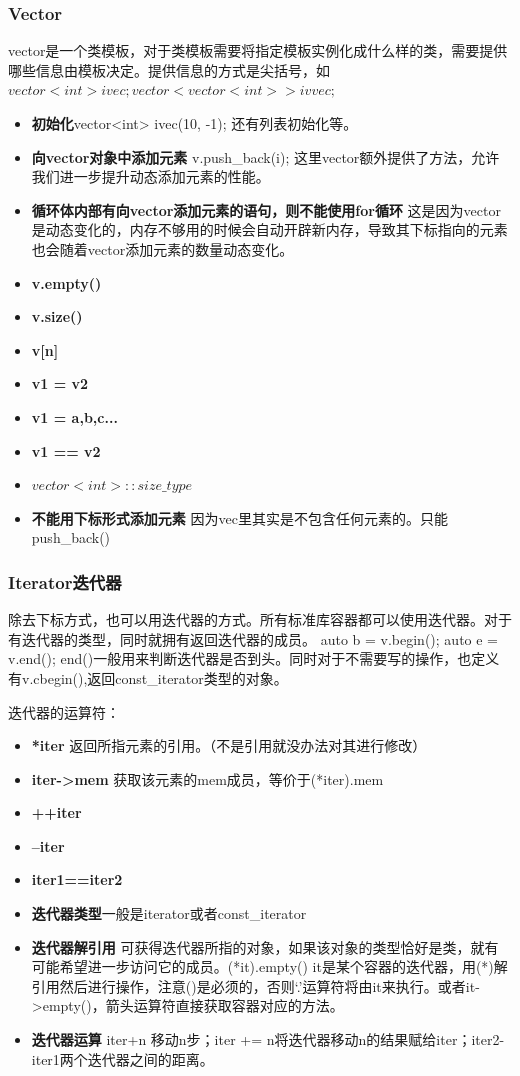 \subsubsection{Vector}
vector是一个类模板，对于类模板需要将指定模板实例化成什么样的类，需要提供哪些信息由模板决定。提供信息的方式是尖括号，如$ vector<int> ivec; vector<vector<int>> ivvec; $
\begin{itemize}
	\item \textbf{初始化}vector<int> ivec(10, -1);  还有列表初始化等。
	\item \textbf{向vector对象中添加元素} v.push\_back(i); 这里vector额外提供了方法，允许我们进一步提升动态添加元素的性能。
	\item \textbf{循环体内部有向vector添加元素的语句，则不能使用for循环} 这是因为vector是动态变化的，内存不够用的时候会自动开辟新内存，导致其下标指向的元素也会随着vector添加元素的数量动态变化。
	\item \textbf{v.empty()}
	\item \textbf{v.size()}
	\item \textbf{v[n]}
	\item \textbf{v1 = v2}
	\item \textbf{v1 = {a,b,c...}}
	\item \textbf{v1 == v2}
	\item $vector<int>::size\_type$
	\item \textbf{不能用下标形式添加元素} 因为vec里其实是不包含任何元素的。只能push\_back()
\end{itemize}

\subsubsection{Iterator迭代器}
除去下标方式，也可以用迭代器的方式。所有标准库容器都可以使用迭代器。对于有迭代器的类型，同时就拥有返回迭代器的成员。 auto b = v.begin(); auto e = v.end(); end()一般用来判断迭代器是否到头。同时对于不需要写的操作，也定义有v.cbegin(),返回const\_iterator类型的对象。

迭代器的运算符：
\begin{itemize}
	\item \textbf{*iter} 返回所指元素的引用。（不是引用就没办法对其进行修改）
	\item \textbf{iter->mem} 获取该元素的mem成员，等价于(*iter).mem
	\item \textbf{++iter}
	\item \textbf{--iter}
	\item \textbf{iter1==iter2}
	\item \textbf{迭代器类型}一般是iterator或者const\_iterator
	\item \textbf{迭代器解引用} 可获得迭代器所指的对象，如果该对象的类型恰好是类，就有可能希望进一步访问它的成员。(*it).empty() it是某个容器的迭代器，用(*)解引用然后进行操作，注意()是必须的，否则‘.’运算符将由it来执行。或者it->empty()，箭头运算符直接获取容器对应的方法。
	\item \textbf{迭代器运算} iter+n 移动n步；iter += n将迭代器移动n的结果赋给iter；iter2-iter1两个迭代器之间的距离。
\end{itemize}

